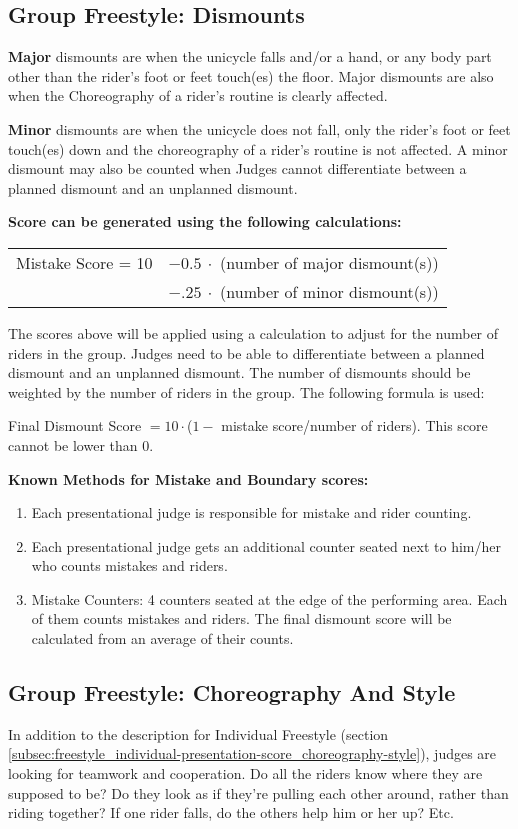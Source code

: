 \subsection{Group Freestyle: Dismounts \label{subsec:freestyle_group-additional-judging-criteria_dismounts}}
\textbf{Major} dismounts are when the unicycle falls and/or a hand, or any body part other than the rider's foot or feet touch(es) the floor.
Major dismounts are also when the Choreography of a rider's routine is clearly affected.

\textbf{Minor} dismounts are when the unicycle does not fall, only the rider's foot or feet touch(es) down and the choreography of a rider's routine is not affected.
A minor dismount may also be counted when Judges cannot differentiate between a planned dismount and an unplanned dismount.

\textbf{Score can be generated using the following calculations:}

\begin{tabular}{r l}
Mistake Score = 10 & $- 0.5\ \cdot$ (number of major dismount(s)) \\
 & $- .25\ \cdot$ (number of minor dismount(s)) \\
\end{tabular}

The scores above will be applied using a calculation to adjust for the number of riders in the group.
Judges need to be able to differentiate between a planned dismount and an unplanned dismount.
The number of dismounts should be weighted by the number of riders in the group. The following formula is used:

Final Dismount Score $= 10 \cdot $($1 -$ mistake score/number of riders).
This score cannot be lower than 0.

\textbf{Known Methods for Mistake and Boundary scores:}
\begin{enumerate}
\item Each presentational judge is responsible for mistake and rider counting. 
\item Each presentational judge gets an additional counter seated next to him/her who counts mistakes and riders. 
\item Mistake Counters: 4 counters seated at the edge of the performing area. Each of them counts mistakes and riders.
The final dismount score will be calculated from an average of their counts.
\end{enumerate}

\subsection{Group Freestyle: Choreography And Style}
In addition to the description for Individual Freestyle (section \ref{subsec:freestyle_individual-presentation-score_choreography-style}), judges are looking for teamwork and cooperation.
Do all the riders know where they are supposed to be? Do they look as if they're pulling each other around, rather than riding together? If one rider falls, do the others help him or her up? Etc.


